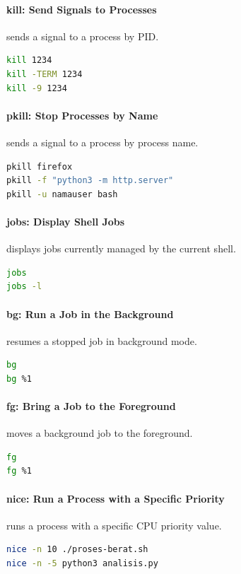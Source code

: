 \paragraph*{kill: Send Signals to Processes}
 sends a signal to a process by PID.
\begin{lstlisting}[language=bash]
kill 1234
kill -TERM 1234
kill -9 1234
\end{lstlisting}

\paragraph*{pkill: Stop Processes by Name}
 sends a signal to a process by process name.
\begin{lstlisting}[language=bash]
pkill firefox
pkill -f "python3 -m http.server"
pkill -u namauser bash
\end{lstlisting}

\paragraph*{jobs: Display Shell Jobs}
 displays jobs currently managed by the current shell.
\begin{lstlisting}[language=bash]
jobs
jobs -l
\end{lstlisting}

\paragraph*{bg: Run a Job in the Background}
 resumes a stopped job in background mode.
\begin{lstlisting}[language=bash]
bg
bg %1
\end{lstlisting}

\paragraph*{fg: Bring a Job to the Foreground}
 moves a background job to the foreground.
\begin{lstlisting}[language=bash]
fg
fg %1
\end{lstlisting}

\paragraph*{nice: Run a Process with a Specific Priority}
 runs a process with a specific CPU priority value.
\begin{lstlisting}[language=bash]
nice -n 10 ./proses-berat.sh
nice -n -5 python3 analisis.py
\end{lstlisting}

